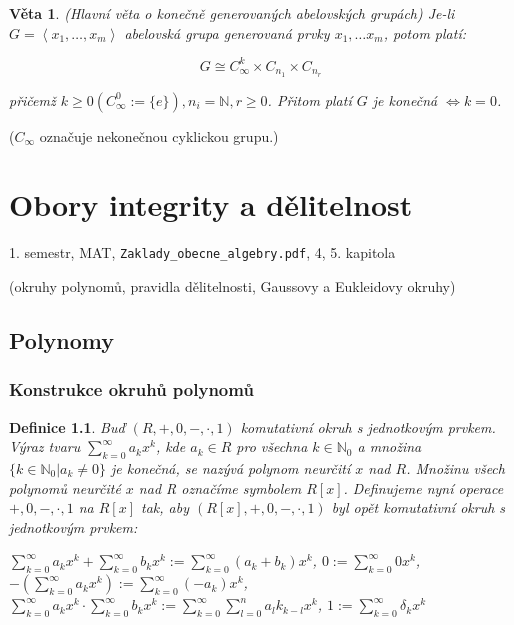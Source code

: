 \documentclass[a4paper, 11pt]{report}
\newtheorem{mydef}{Definice}[chapter]
\newtheorem{veta}{Věta}
\begin{document}
\begin{veta}
(Hlavní věta o konečně generovaných abelovských grupách) Je-li $G = \left< x_1, \dots, x_m \right>$ abelovská grupa generovaná prvky $x_1, \dots x_m$, potom platí:

$$ G \cong C_\infty^k \times C_{n_1} \times C_{n_r} $$

přičemž $k \geq 0 (C_\infty^0 := \{e\}), n_i = \mathbb{N}, r \geq 0$. Přitom platí $G$ je konečná $\Leftrightarrow k = 0$.
\end{veta}
($C_\infty$ označuje nekonečnou cyklickou grupu.)

















\chapter{Obory integrity a dělitelnost} \label{cha:10}

1. semestr, MAT, \texttt{Zaklady\_obecne\_algebry.pdf}, 4, 5. kapitola

(okruhy polynomů, pravidla dělitelnosti, Gaussovy a Eukleidovy okruhy)

\section{Polynomy}
\subsection{Konstrukce okruhů polynomů}

\begin{mydef}
Buď $(R, +, 0, -, \cdot, 1)$ komutativní okruh s jednotkovým prvkem. Výraz tvaru $\sum_{k=0}^\infty a_kx^k$, kde $a_k \in R$ pro všechna $k \in \mathbb{N}_0$ a množina $\{k \in \mathbb{N}_0 | a_k \not= 0\}$ je konečná, se nazývá polynom neurčití $x$ nad $R$. Množinu všech polynomů neurčité $x$ nad R označíme symbolem $R[x]$. Definujeme nyní operace $+, 0, -, \cdot, 1$ na $R[x]$ tak, aby $(R[x], +, 0, -, \cdot, 1)$ byl opět komutativní okruh s jednotkovým prvkem:

$ \sum_{k = 0}^\infty a_k x^k + \sum_{k = 0}^\infty b_k x^k  := \sum_{k = 0}^\infty (a_k + b_k) x^k$,
$0 := \sum_{k = 0}^\infty 0 x^k $,
$-(\sum_{k = 0}^\infty a_k x^k) := \sum_{k = 0}^\infty (-a_k) x^k$,
$\sum_{k = 0}^\infty a_k x^k \cdot \sum_{k = 0}^\infty b_k x^k := \sum_{k = 0}^\infty \sum_{l = 0}^n a_l k_{k-l} x^k$,
$1 := \sum_{k = 0}^\infty \delta_k x^k$
\end{mydef}
\end{document}
